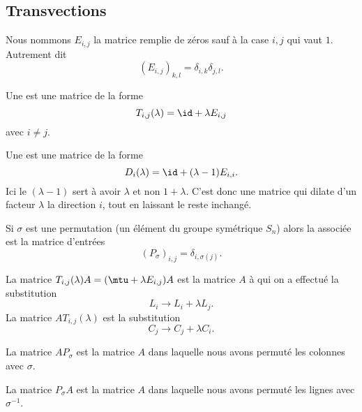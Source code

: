 \subsection{Transvections}

Nous nommons \( E_{i,j}\) la matrice remplie de zéros sauf à la case \( i,j\) qui vaut \( 1\). Autrement dit
\begin{equation}
	(E_{i,j})_{k,l}=\delta_{i,k}\delta_{j,l}.
\end{equation}
\begin{definition}
	Une  est une matrice de la forme
	\begin{equation}
		T_{i,j}(\lambda)=\id+\lambda E_{i,j}
	\end{equation}
	avec \( i\neq j\).

	Une  est une matrice de la forme
	\begin{equation}
		D_i(\lambda)=\id+(\lambda-1)E_{i,i}.
	\end{equation}
	Ici le \( (\lambda-1)\) sert à avoir \( \lambda\) et non \( 1+\lambda\). C'est donc une matrice qui dilate d'un facteur \( \lambda\) la direction \( i\), tout en laissant le reste inchangé.

	Si \( \sigma\) est une permutation (un élément du groupe symétrique \( S_n\)) alors la  associée est la matrice d'entrées
	\begin{equation}
		(P_{\sigma})_{i,j}=\delta_{i,\sigma(j)}.
	\end{equation}
\end{definition}

\begin{lemma}   \label{LemyrAXQs}
	La matrice \( T_{i,j}(\lambda)A=(\mtu+\lambda E_{i,j})A\) est la matrice \( A\) à qui on a effectué la substitution
	\begin{equation}
		L_i\to L_i+\lambda L_j.
	\end{equation}
	La matrice \( AT_{i,j}(\lambda)\) est la substitution
	\begin{equation}
		C_j\to C_j+\lambda C_i.
	\end{equation}

	La matrice \( AP_{\sigma}\) est la matrice \( A\) dans laquelle nous avons permuté les colonnes avec \( \sigma\).

	La matrice \( P_{\sigma}A\) est la matrice \( A\) dans laquelle nous avons permuté les lignes avec \( \sigma^{-1}\).
\end{lemma}

